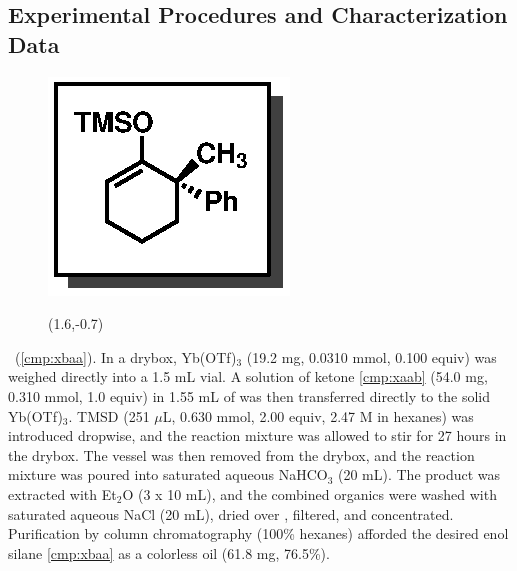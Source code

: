\pagebreak
\subsection{Experimental Procedures and Characterization Data}     
\begin{figure}
  \vspace{-25pt}
  \begin{center}
    \includegraphics[scale=0.8]{chp_singlecarbon/images/xbaa}
    \begin{textblock}{1}(1.6,-0.7)  \end{textblock}
  \end{center}
  \vspace{-30pt}
\end{figure}
\textbf{\CMPxbaa}\ (\ref{cmp:xbaa}). In a drybox, Yb(OTf)$_3$ (19.2 mg, 0.0310 mmol, 0.100 equiv)
was weighed directly into a 1.5 mL vial. A solution of ketone \ref{cmp:xaab} (54.0 mg, 0.310 mmol,
1.0 equiv) in 1.55 mL of  was then transferred directly to the solid Yb(OTf)$_3$. TMSD
(251 $\mu$L, 0.630 mmol, 2.00 equiv, 2.47 M in hexanes) was introduced dropwise, and the reaction
mixture was allowed to stir for 27 hours in the drybox. The vessel was then removed from the drybox, and the reaction mixture was
poured into saturated aqueous NaHCO$_3$ (20 mL). The product was extracted with Et$_2$O (3 x 10 mL),
and the combined organics were washed with saturated aqueous NaCl (20 mL), dried over ,
filtered, and concentrated. Purification by column chromatography (100\% hexanes) afforded the
desired enol silane \ref{cmp:xbaa} as a colorless oil (61.8 mg, 76.5\%). \\
